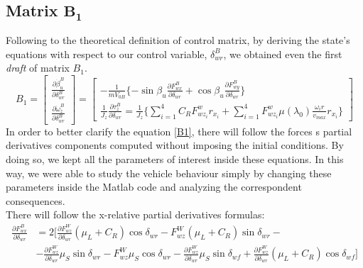 \subsection{Matrix $\mathbf{B_{1}}$}
	Following to the theoretical definition of control matrix, by deriving the state's equations with respect to our control variable, $\delta_{wr}^{B}$, we obtained even the first \textit{draft} of matrix $B_{1}$.
		\begin{equation} \label{B1}
			B_{1}=
			\begin{bmatrix}
				\frac{\partial\dot{\beta}_{u}^{B}}{\partial\delta_{wr}^{B}} \\
				\frac{\partial\dot{\omega}_{z}^{B}}{\partial\delta_{wr}^{B}}
			\end{bmatrix} =
			\begin{bmatrix}
				-\frac{1}{mV_{0B}}\{-\sin\beta_{u}\frac{\partial F_{wx}^{B}}{\partial \delta_{wr}} + \cos\beta_{u}\frac{\partial F_{wy}^{B}}{\partial \delta_{wr}}\}  \\
				\frac{1}{J_{z}} \frac{\partial \tau_{z}^{B}}{\partial\delta_{wr}} = \frac{1}{J_{z}} \{ \sum\limits_{i=1}^4 C_{R}F_{wz_{i}}^{w} r_{x_{i}} + \sum\limits_{i=1}^4 F_{wz_{i}}^{w} \mu(\lambda_{0}) \frac{\omega_{i} r}{v_{max}}r_{x_{i}} \}
			\end{bmatrix}
		\end{equation}
	In order to better clarify the equation \ref{B1}, there will follow the forces s partial derivatives components computed without imposing the initial conditions. By doing so, we kept all the parameters of interest inside these equations. In this way, we were able to study the vehicle behaviour simply by changing these parameters inside the Matlab code and analyzing the correspondent consequences. \\ There will follow the x-relative partial derivatives formulas:
		\begin{equation} \label{Fwx su deltaR }
			\begin{split}
				\frac{\partial F_{wx}^{B}}{\partial \delta_{wr}} &= 2 [\frac{\partial F_{wz}^{W}}{\partial \delta_{wr}} (\mu_{L}+C_{R}) \cos\delta_{wr} - F_{wz}^{W} (\mu_{L}+C_{R})\sin\delta_{wr} - \\
				&- \frac{\partial F_{wz}^{W}}{\partial \delta_{wr}} \mu_{S} \sin \delta_{wr} - F_{wz}^{W} \mu_{S}\cos\delta_{wr} - \frac{\partial F_{wz}^{W}}{\partial \delta_{wr}} \mu_{S} \sin \delta_{wf} + \frac{\partial F_{wz}^{W}}{\partial \delta_{wr}} (\mu_{L}+C_{R}) \cos\delta_{wf}]
			\end{split}
		\end{equation}
